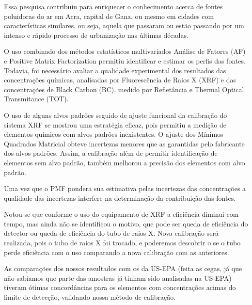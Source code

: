 

Essa pesquisa contribuiu para enriquecer o conhecimento acerca de fontes 
poluidoras do ar em Acra, capital de Gana, ou mesmo em cidades com características similares, ou seja, aquela que passaram ou estão passando por um intenso e rápido processo de urbanização nas últimas décadas.  

O uso combinado dos  métodos estatísticos multivariados Análise de Fatores (AF) e Positive Matrix Factorization permitiu identificar e estimar os perfis das fontes. Todavia, foi necessário avaliar
a qualidade experimental dos resultados das concentrações químicas, analisadas por Fluorescência de Raios X (XRF) e das concentrações de Black Carbon (BC), medido por Refletância e Thermal Optical Transmitance (TOT). 

O uso de alguns alvos padrões seguido de ajuste funcional da calibração do sistema XRF se mostrou uma estratégia eficaz, pois permitiu a medição de elementos químicos com alvos padrões inexistentes. O ajuste dos Mínimos Quadrados Matricial obteve incertezas menores que as garantidas pelo fabricante dos alvos padrões. Assim, a calibração além de permitir identificação de elementos sem alvo padrão, também melhorou a precisão dos elementos com alvo padrão. 

Uma vez que o PMF pondera sua estimativa pelas incertezas das concentrações a qualidade das incertezas interfere na determinação da contribuição das fontes.

Notou-se que conforme o uso do equipamento de XRF a eficiência diminui com tempo, mas ainda não se identificou o motivo, que pode ser queda de eficiência do detector ou queda de eficiência do tubo de raios X. Nova calibração será realizada, pois o tubo de raios X foi trocado, e poderemos descobrir o se o tubo perde eficiência com o uso comparando a nova calibração com as anteriores. 

As comparações dos nossos resultados com os da US-EPA (feita as cegas, já que não sabíamos que parte das amostras já tinham sido analisadas na US-EPA) tiveram ótimas concordâncias para os elementos com concentrações acimas do limite de detecção, validando nossa método de calibração.   


